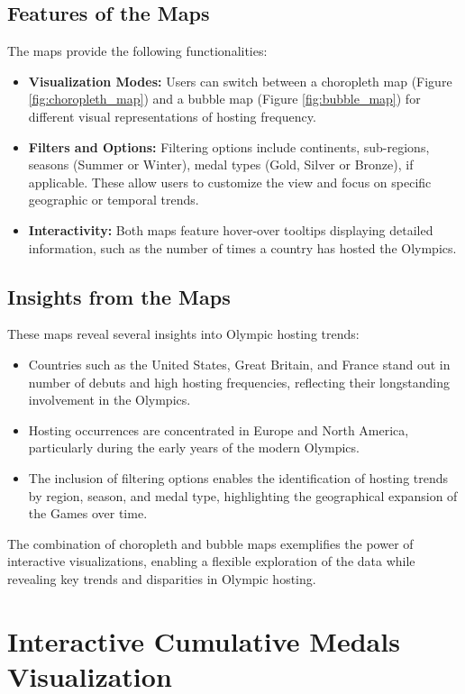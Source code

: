 \subsection{Features of the Maps}

The maps provide the following functionalities:
\begin{itemize}
    \item \textbf{Visualization Modes:} Users can switch between a choropleth map (Figure \ref{fig:choropleth_map}) and a bubble map (Figure \ref{fig:bubble_map}) for different visual representations of hosting frequency.
    \item \textbf{Filters and Options:} Filtering options include continents, sub-regions, seasons (Summer or Winter), medal types (Gold, Silver or Bronze), if applicable. These allow users to customize the view and focus on specific geographic or temporal trends.
    \item \textbf{Interactivity:} Both maps feature hover-over tooltips displaying detailed information, such as the number of times a country has hosted the Olympics.
\end{itemize}

\subsection{Insights from the Maps}

These maps reveal several insights into Olympic hosting trends:
\begin{itemize}
    \item Countries such as the United States, Great Britain, and France stand out in number of debuts and high hosting frequencies, reflecting their longstanding involvement in the Olympics.
    \item Hosting occurrences are concentrated in Europe and North America, particularly during the early years of the modern Olympics.
    \item The inclusion of filtering options enables the identification of hosting trends by region, season, and medal type, highlighting the geographical expansion of the Games over time.
\end{itemize}

The combination of choropleth and bubble maps exemplifies the power of interactive visualizations, enabling a flexible exploration of the data while revealing key trends and disparities in Olympic hosting.

\section{Interactive Cumulative Medals Visualization}

